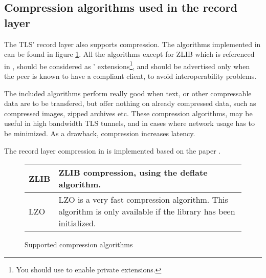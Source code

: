 \subsection{Compression algorithms used in the record layer}
The TLS' record layer also supports compression. The algorithms
implemented in \gnutls{} can be found in figure \ref{fig:compression}.
All the algorithms except for ZLIB which is referenced in \cite{TLSCOMP}, should be 
considered as \gnutls' extensions\footnote{You should use 
to enable private extensions.}, and
should be advertised only when the peer is known to have a compliant client,
to avoid interoperability problems.
\par
The included algorithms perform really good when text, or other
compressable data are to be transfered, but offer nothing on already 
compressed data, such as compressed images, zipped archives etc.
These compression algorithms, may be useful in high bandwidth TLS tunnels,
and in cases where network usage has to be minimized. As a drawback, 
compression increases latency.

\par
The record layer compression in \gnutls{} is implemented based on
the paper \cite{TLSCOMP}.

\begin{figure}[hbtp]
\begin{tabular}{|l|p{9cm}|}

\hline
ZLIB & ZLIB compression, using the deflate algorithm.
\\
\hline
LZO & LZO is a very fast compression algorithm. This algorithm is only
available if the \gnutlse{} library has been initialized.
\\
\hline
\end{tabular}
\caption{Supported compression algorithms}
\label{fig:compression}
\end{figure}


